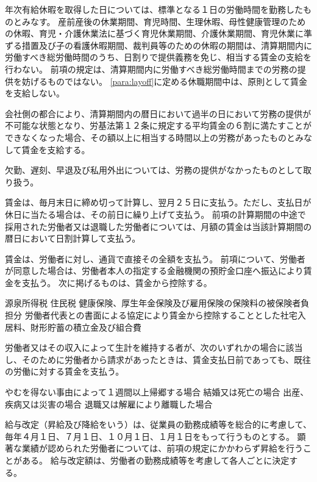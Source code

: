 \documentclass[10pt,a4paper,uplatex]{jsarticle}
\begin{document}
年次有給休暇を取得した日については、標準となる１日の労働時間を勤務したものとみなす。
\term
産前産後の休業期間、育児時間、生理休暇、母性健康管理のための休暇、育児・介護休業法に基づく育児休業期間、介護休業期間、育児休業に準ずる措置及び子の看護休暇期間、裁判員等のための休暇の期間は、清算期間内に労働すべき総労働時間のうち、日割りで提供義務を免じ、相当する賃金の支給を行わない。 
\term
前項の規定は、清算期間内に労働すべき総労働時間までの労務の提供を妨げるものではない。
\term
\ref{para:layoff}に定める休職期間中は、原則として賃金を支給しない。

会社側の都合により、清算期間内の暦日において過半の日において労務の提供が不可能な状態となり、労基法第１２条に規定する平均賃金の６割に満たすことができなくなった場合、その額以上に相当する時間以上の労務があったものとみなして賃金を支給する。

欠勤、遅刻、早退及び私用外出については、労務の提供がなかったものとして取り扱う。

賃金は、毎月末日に締め切って計算し、翌月２５日に支払う。ただし、支払日が休日に当たる場合は、その前日に繰り上げて支払う。
\term
前項の計算期間の中途で採用された労働者又は退職した労働者については、月額の賃金は当該計算期間の暦日において日割計算して支払う。

賃金は、労働者に対し、通貨で直接その全額を支払う。
\term
前項について、労働者が同意した場合は、労働者本人の指定する金融機関の預貯金口座へ振込により賃金を支払う。
\term
次に掲げるものは、賃金から控除する。
\begin{enumerate}
    \itm 源泉所得税
    \itm 住民税
    \itm 健康保険、厚生年金保険及び雇用保険の保険料の被保険者負担分
    \itm 労働者代表との書面による協定により賃金から控除することとした社宅入居料、財形貯蓄の積立金及び組合費
\end{enumerate}

労働者又はその収入によって生計を維持する者が、次のいずれかの場合に該当し、そのために労働者から請求があったときは、賃金支払日前であっても、既往の労働に対する賃金を支払う。
\begin{enumerate}
    \itm やむを得ない事由によって１週間以上帰郷する場合
    \itm 結婚又は死亡の場合
    \itm 出産、疾病又は災害の場合
    \itm 退職又は解雇により離職した場合
\end{enumerate}

給与改定（昇給及び降給をいう）は、従業員の勤務成績等を総合的に考慮して、毎年４月１日、７月１日、１０月１日、１月１日をもって行うものとする。
\term
顕著な業績が認められた労働者については、前項の規定にかかわらず昇給を行うことがある。
\term
給与改定額は、労働者の勤務成績等を考慮して各人ごとに決定する。
\end{document}
